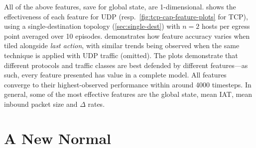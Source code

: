 \documentclass[10pt, times, conference, letterpaper]{IEEEtran}
\begin{document}
All of the above features, save for global state, are 1-dimensional.
 shows the effectiveness of each feature for UDP (resp.\ \cref{fig:tcp-cap-feature-plots} for TCP), using a single-destination topology (\cref{sec:single-dest}) with $n=2$ hosts per egress point averaged over 10 episodes.
 demonstrates how feature accuracy varies when tiled alongside \emph{last action}, with similar trends being observed when the same technique is applied with UDP traffic (omitted).
The plots demonstrate that different protocols and traffic classes are best defended by different features---as such, every feature presented has value in a complete model.
All features converge to their highest-observed performance within around \num{4000} timesteps.
In general, some of the most effective features are the global state, mean IAT, mean inbound packet size and $\Delta$ rates.

\section{A New Normal}\label{sec:a-new-normal}

%
\end{document}
